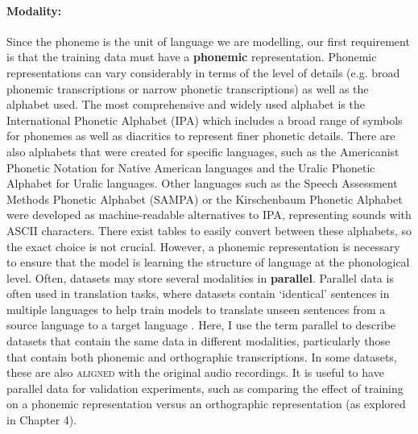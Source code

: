 \paragraph{Modality:} Since the phoneme is the unit of language we are modelling, our first requirement is that the training data must have a \textbf{phonemic} representation. Phonemic representations can vary considerably in terms of the level of details (e.g. broad phonemic transcriptions or narrow phonetic transcriptions) as well as the alphabet used. The most comprehensive and widely used alphabet is the International Phonetic Alphabet (IPA) which includes a broad range of symbols for phonemes as well as diacritics to represent finer phonetic details. There are also alphabets that were created for specific languages, such as the Americanist Phonetic Notation for Native American languages and the Uralic Phonetic Alphabet for Uralic languages. Other languages such as the Speech Assessment Methods Phonetic Alphabet (SAMPA) \citep{wells1992standard} or the Kirschenbaum Phonetic Alphabet were developed as machine-readable alternatives to IPA, representing sounds with ASCII characters. There exist tables to easily convert between these alphabets, so the exact choice is not crucial. However, a phonemic representation is necessary to ensure that the model is learning the structure of language at the phonological level. Often, datasets may store several modalities in \textbf{parallel}. Parallel data is often used in translation tasks, where datasets contain `identical' sentences in multiple languages to help train models to translate unseen sentences from a source language to a target language \rough{[citation]}. Here, I use the term parallel to describe datasets that contain the same data in different modalities, particularly those that contain both phonemic and orthographic transcriptions. In some datasets, these are also \textsc{aligned} with the original audio recordings. It is useful to have parallel data for validation experiments, such as comparing the effect of training on a phonemic representation versus an orthographic representation (as explored in Chapter 4). 

